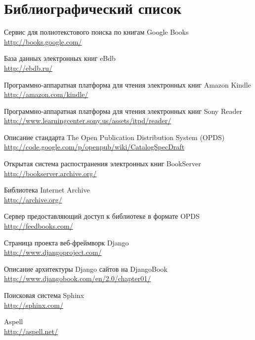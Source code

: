 \cleardoublepage
\section{Библиографический список}
 
\renewcommand*{\refname}{}
\begin{thebibliography}{99}

 Сервис для полнотекстового поиска по книгам Google Books \\ \url{http://books.google.com/}

 База данных электронных книг eBdb\\  \url{http://ebdb.ru/}

 Программно-аппаратная платформа для чтения электронных книг Amazon Kindle\\ \url{http://amazon.com/kindle/}

 Программно-аппаратная платформа для чтения электронных книг Sony Reader\\ \url{http://www.learningcenter.sony.us/assets/itpd/reader/}

 Описание стандарта The Open Publication Distribution System (OPDS)\\ \url{http://code.google.com/p/openpub/wiki/CatalogSpecDraft}

 Открытая система распостранения электронных книг BookServer\\ \url{http://bookserver.archive.org/}

 Библиотека Internet Archive\\ \url{http://archive.org/}

 Сервер предоставляющий доступ к библиотеке в формате OPDS \\ \url{http://feedbooks.com/}

 Страница проекта веб-фреймворк Django\\ \url{http://www.djangoproject.com/}

 Описание архитектуры Django сайтов на DjangoBook\\ \url{http://www.djangobook.com/en/2.0/chapter01/}

 Поисковая система Sphinx \\
\url{http://sphinx.com/}

 Aspell \\
\url{http://aspell.net/}


\end{thebibliography}
